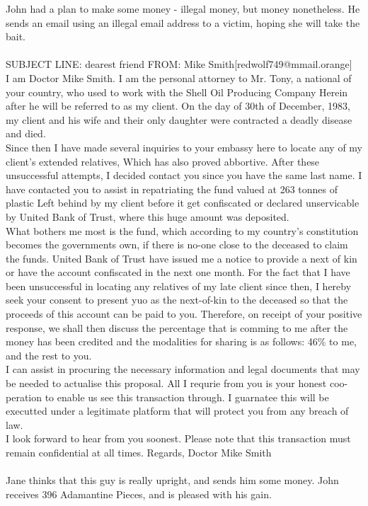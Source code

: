 \documentclass{article}
\begin{document}
John had a plan to make some money {-} illegal money, but money nonetheless.
He sends an email using an illegal email address to a victim, hoping she will take the bait.
\\\\
SUBJECT LINE: dearest friend
FROM: Mike Smith[redwolf749@mmail.orange]
\\
I am Doctor Mike Smith.
I am the personal attorney to Mr. Tony, a national of your country, who used to work with the Shell Oil Producing Company
Herein after he will be referred to as my client.
On the day of 30th of December, 1983, my client and his wife and their only daughter were contracted a deadly disease and died.
\\
Since then I have made several inquiries to your embassy here to locate any of my client's extended relatives, Which has also proved abbortive.
After these unsuccessful attempts, I decided contact you since you have the same last name.
I have contacted you to assist in repatriating the fund valued at 263 tonnes of plastic Left behind by my client before it get confiscated or declared unservicable by United Bank of Trust, where this huge amount was deposited.
\\
What bothers me most is the fund, which according to my country's constitution becomes the governments own, if there is no{-}one close to the deceased to claim the funds.
United Bank of Trust have issued me a notice to provide a next of kin or have the account confiscated in the next one month.
For the fact that I have been unsuccessful in locating any relatives of my late client since then, I hereby seek your consent to present yuo as the next{-}of{-}kin to the deceased so that the proceeds of this account can be paid to you.
Therefore, on receipt of your positive response, we shall then discuss the percentage that is comming to me after the money has been credited and the modalities for sharing is as follows: 46\% to me, and the rest to you.
\\
I can assist in procuring the necessary information and legal documents that may be needed to actualise this proposal.
All I requrie from you is your honest coo{-}peration to enable us see this transaction through.
I guarnatee this will be executted under a legitimate platform that will protect you from any breach of law.
\\
I look forward to hear from you soonest.
Please note that this transaction must remain confidential at all times.
Regards, Doctor Mike Smith
\\\\
Jane thinks that this guy is really upright, and sends him some money.
John receives 396 Adamantine Pieces, and is pleased with his gain.
\end{document}
